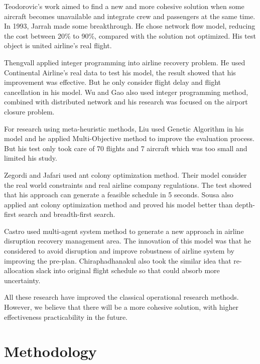 \documentclass[senior]{IPSstyle}
\begin{document}
Teodorovic's\cite{teodorovic1984optimal} work aimed to find a new and more cohesive solution when some aircraft becomes unavailable and integrate crew and passengers at the same time. In 1993, Jarrah made some breakthrough. He chose network flow model, reducing the cost between 20\% to 90\%, compared with the solution not optimized. His test object is united airline's real flight. 

Thengvall\cite{thengvall2001multiple} applied integer programming into airline recovery problem. He used Continental Airline's real data to test his model, the result showed that his improvement was effective. But he only consider flight delay and flight cancellation in his model.
Wu and Gao\cite{wu2017rapid} also used integer programming method, combined with distributed network and his research was focused on the airport closure problem.

For research using meta-heuristic methods, Liu used Genetic Algorithm in his model and he applied Multi-Objective method to improve the evaluation process. But his test only took care of 70 flights and 7 aircraft which was too small and limited his study.

Zegordi and Jafari\cite{zegordi2010solving} used ant colony optimization method. Their model consider the real world constraints and real airline company regulations. The test showed that his approach can generate a feasible schedule in 5 seconds. Sousa\cite{sousa2015airline} also applied ant colony optimization method and proved his model better than depth-first search and breadth-first search. 

Castro\cite{castro2011new} used multi-agent system method to generate a new approach in airline disruption recovery management area. The innovation of this model was that he considered to avoid disruption and improve robustness of airline system by improving the pre-plan. Chiraphadhanakul\cite{chiraphadhanakul2013robust} also took the similar idea that re-allocation slack into original flight schedule so that could absorb more uncertainty.

All these research have improved the classical operational research methods. However, we believe that there will be a more cohesive solution, with higher effectiveness practicability in the future.

\chapter{Methodology} \label{methodology}
\end{document}
